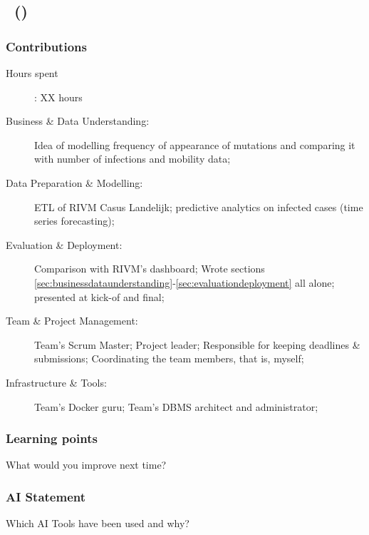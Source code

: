 \subsection{\teammemberAname~(\teammemberAstudentid)}
\subsubsection{Contributions}
\begin{description}
  \item[Hours spent]: XX hours
  \item[Business \& Data Understanding:] Idea of modelling frequency of appearance of mutations and comparing it with number of infections and mobility data;
  \item[Data Preparation \& Modelling:] ETL of RIVM Casus Landelijk; predictive analytics on infected cases (time series forecasting);
  \item[Evaluation \& Deployment:] Comparison with RIVM's dashboard; Wrote sections \ref{sec:businessdataunderstanding}-\ref{sec:evaluationdeployment} all alone; presented at kick-of and final;
  \item[Team \& Project Management:] Team's Scrum Master; Project leader; Responsible for keeping deadlines \& submissions; Coordinating the team members, that is, myself;
  \item[Infrastructure \& Tools:] Team's Docker guru; Team's DBMS architect and administrator;
\end{description}

\subsubsection{Learning points}
What would you improve next time?

\subsubsection{AI Statement}
Which AI Tools have been used and why? \cite{AI_Index}